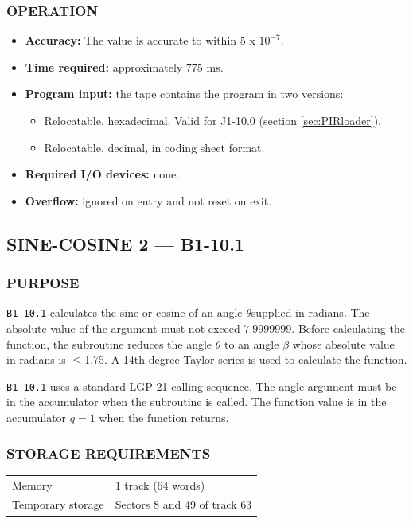 \subsubsection*{OPERATION}
\begin{itemize}
    \item \textbf{Accuracy:} The value is accurate to within 5 x $10^{-7}$.
    \item \textbf{Time required:} approximately 775 ms.
    \item \textbf{Program input:} the tape contains the program in two versions: %
    \begin{itemize}
      \item Relocatable, hexadecimal. Valid for J1-10.0 (section \ref{sec:PIRloader}).
        \item Relocatable, decimal, in coding sheet format.
    \end{itemize}
    \item \textbf{Required I/O devices:} none.
    \item \textbf{Overflow:} ignored on entry and not reset on exit.
\end{itemize}

\newpage

\subsection*{SINE-COSINE 2 --- B1-10.1}
\label{sec:sine_cosine_2}

\subsubsection*{PURPOSE}
\texttt{B1-10.1} calculates the sine or cosine of an angle $\theta$supplied in radians. The absolute value of the argument must not exceed $7.9999999$. Before calculating the function, the subroutine reduces the angle $\theta$ to an angle $\beta$ whose absolute value in radians is $\le$1.75. A 14th-degree Taylor series is used to calculate the function.

\texttt{B1-10.1} uses a standard LGP-21 calling sequence. The angle argument must be in the accumulator when the subroutine is called. The function value is in the accumulator $q=1$ when the function returns.

\subsubsection*{STORAGE REQUIREMENTS}
\begin{center}
\begin{tabular}{ll}
    \toprule
    Memory & 1 track (64 words) \\
    Temporary storage & Sectors 8 and 49 of track 63 \\
    \bottomrule
\end{tabular}
\end{center}

